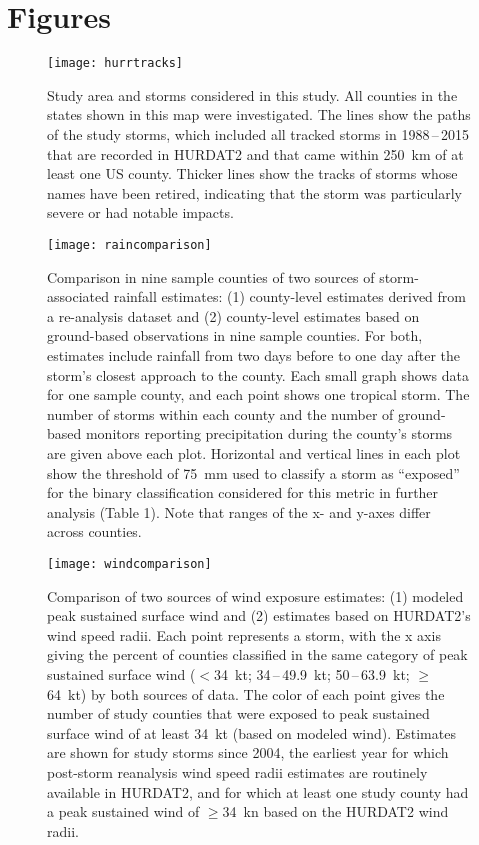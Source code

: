\section*{Figures}

\listoffigures

\clearpage

\begin{figure}[tbhp!] \centering
\texttt{[image: hurrtracks]}
\caption{Study area and storms considered in this study. All counties in the states
	shown in this map were investigated. The lines show the paths of the
	study storms, which included all tracked storms in 1988\,--\,2015 that
	are recorded in \ac{HURDAT2} and that came
	within 250~\si{\kilo\metre} of at least one \ac{US} county. Thicker
	lines show the tracks of storms whose names have been retired,
	indicating that the storm was particularly severe or had notable
	impacts.  }
\label{fig:hurrtracks}
\end{figure}

\clearpage

\begin{figure}[tbhp!] \centering
\texttt{[image: raincomparison]} 
	\caption{Comparison in nine sample counties of two sources of storm-associated 
	rainfall estimates: (1) county-level estimates derived from 
	a re-analysis dataset and (2) county-level estimates based on ground-based
	observations in nine sample counties. For both, estimates  
	include rainfall from two days before to one day after the storm's closest
	approach to the county. Each small graph shows data for one sample county, 
	and each point shows one tropical storm. The number of storms 
	within each county and the number of ground-based monitors reporting precipitation during 
	the county's storms are given above each plot. Horizontal and vertical lines 
	in each plot show the threshold of 75~\si{\milli\metre} used to classify a storm 
	as ``exposed'' for the binary classification considered for this metric 
	in further analysis (Table 1). Note that 
	ranges of the x- and y-axes differ across counties.
	} 
\label{fig:raincomparison}
\end{figure}

\begin{figure}[tbhp!]
\centering
\texttt{[image: windcomparison]}
	\caption{Comparison of two sources of wind exposure estimates: 
	(1) modeled peak sustained surface wind 
	and (2) estimates based on \ac{HURDAT2}'s wind speed radii.
	Each point represents a storm, with the x axis giving the percent of
	counties classified in the same category of peak sustained surface
	wind ($<$34~kt; 34\,--\,49.9~kt;
	50\,--\,63.9~kt; $\ge$64~kt) by both sources of 
	data. The color of each point gives the number of study counties that were exposed to
	peak sustained surface wind of at least 34~kt (based
	on modeled wind). Estimates are shown for study storms since
	2004, the earliest year for which post-storm reanalysis wind speed
	radii estimates are routinely available in \ac{HURDAT2}, and for which at
	least one study county had a peak sustained wind of $\ge$34~\si{\knot}
	based on the \ac{HURDAT2} wind radii.
	}
\label{fig:windcomparison}
\end{figure}

